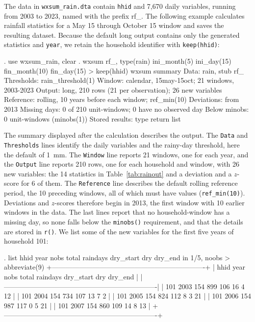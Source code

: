The data in \texttt{wxsum\_rain.dta} contain \texttt{hhid} and 7,670 daily variables, running from 2003 to 2023, named with the prefix rf\_. The following example calculates rainfall statistics for a May 15 through October 15 window and saves the resulting dataset. Because the default long output contains only the generated statistics and \texttt{year}, we retain the household identifier with \texttt{keep(hhid)}:

\begin{stlog}
. use wxsum_rain, clear
{\smallskip}
. wxsum rf_, type(rain) ini_month(5) ini_day(15) fin_month(10) fin_day(15)
> keep(hhid)
{\smallskip}
wxsum summary
  Data:          rain, stub rf_
  Thresholds:    rain_threshold(1)
  Window:        calendar, 15may-15oct; 21 windows, 2003-2023
  Output:        long, 210 rows (21 per observation); 26 new variables
  Reference:     rolling, 10 years before each window; ref_min(10)
  Deviations:    from 2013
  Missing days:  0 of 210 unit-windows; 0 have no observed day
  Below minobs:  0 unit-windows (minobs(1))
  Stored results: type return list
\end{stlog}

\noindent The summary displayed after the calculation describes the output. The \texttt{Data} and \texttt{Thresholds} lines identify the daily variables and the rainy-day threshold, here the default of 1~mm. The \texttt{Window} line reports 21 windows, one for each year, and the \texttt{Output} line reports 210 rows, one for each household and window, with 26 new variables: the 14 statistics in Table~\ref{tab:rainout} and a deviation and a $z$-score for 6 of them. The \texttt{Reference} line describes the default rolling reference period, the 10 preceding windows, all of which must have values (\texttt{ref\_min(10)}). Deviations and $z$-scores therefore begin in 2013, the first window with 10 earlier windows in the data. The last lines report that no household-window has a missing day, so none falls below the \texttt{minobs()} requirement, and that the details are stored in \texttt{r()}. We list some of the new variables for the first five years of household 101:

\begin{stlog}
. list hhid year nobs total raindays dry_start dry dry_end in 1/5, noobs
> abbreviate(9)
{\smallskip}
  +-------------------------------------------------------------------+
  | hhid   year   nobs   total   raindays   dry_start   dry   dry_end |
  |-------------------------------------------------------------------|
  |  101   2003    154     899        106          16     4        12 |
  |  101   2004    154     734        107          13     7         2 |
  |  101   2005    154     824        112           8     3        21 |
  |  101   2006    154     987        117           0     5        21 |
  |  101   2007    154     860        109          14     8        13 |
  +-------------------------------------------------------------------+
\end{stlog}

